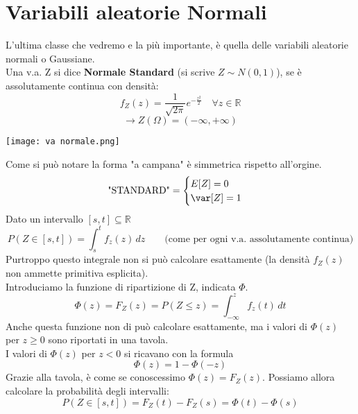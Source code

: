 \section{Variabili aleatorie Normali}
L'ultima classe che vedremo e la più importante, è quella delle variabili aleatorie
normali o Gaussiane.
\\ Una v.a. Z si dice \textbf{Normale Standard} (si scrive $Z \sim N(0,1)$), se è
assolutamente continua con densità:
\begin{equation*}
	f_Z(z)= \frac{1}{\sqrt{2 \pi}} e^{-\frac{z^2}{2}}
	\quad \forall z \in \mathbb{R}
\end{equation*}
\begin{equation*}
	\rightarrow Z(\Omega) = (-\infty, + \infty)
\end{equation*}
\begin{center}
	\texttt{[image: va normale.png]}
\end{center}
Come si può notare la forma "a campana" è simmetrica rispetto all'orgine.
\begin{equation}
	\text{"STANDARD"} =
	\begin{cases}
		E[Z] = 0 \\
		\var[Z] = 1
	\end{cases}
\end{equation}
Dato un intervallo $[s,t] \subseteq \mathbb{R}$
\begin{equation*}
	P(Z\in [s,t]) = \int_{s}^{t} f_z(z)\,dz \qquad
	\text{(come per ogni v.a. assolutamente continua)}
\end{equation*}
Purtroppo questo integrale non si può calcolare esattamente (la densità $f_Z(z)$
non ammette primitiva esplicita).
\\ Introduciamo la funzione di ripartizione di Z, indicata $\Phi$.
\begin{equation*}
	\Phi(z) = F_Z(z) = P(Z \leq z) = \int_{-\infty}^{z}f_z(t)\,dt
\end{equation*}
Anche questa funzione non di può calcolare esattamente, ma i valori di $\Phi(z)$ per
$z \geq 0$ sono riportati in una tavola.
\\ I valori di $\Phi(z)$ per $z < 0$ si ricavano con la formula
\begin{equation*}
	\Phi(z) = 1 - \Phi(-z)
\end{equation*}
Grazie alla tavola, è come se conoscessimo $\Phi(z) = F_Z(z)$.
Possiamo allora calcolare la probabilità degli intervalli:
\begin{equation*}
	P(Z\in [s,t]) = F_Z(t) - F_Z(s) = \Phi(t) - \Phi(s)
\end{equation*}
